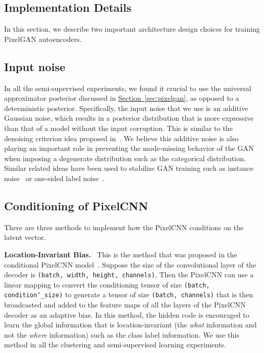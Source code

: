 \documentclass{article}
\newcommand{\mysec}[1]{\hyperref[sec:#1]{Section~\ref*{sec:#1}}}
\DeclareRobustCommand{\parhead}[1]{\textbf{#1}~}
\begin{document}
\begin{appendices}



\section{Implementation Details}\label{appendix:implementation}
In this section, we describe two important architecture design choices for training PixelGAN autoencoders.

\subsection{Input noise}
\label{appendix:input_noise}

In all the semi-supervised experiments, we found it crucial to use the universal approximator posterior discussed in \mysec{pixelgan}, as opposed to a deterministic posterior. Specifically, the input noise that we use is an additive Gaussian noise, which results in a posterior distribution  that is more expressive than that of a model without the input corruption. This is similar to the denoising criterion idea proposed in~\citep{denoising-vae}. We believe this additive noise is also playing an important role in preventing the mode-missing behavior of the GAN when imposing a degenerate distribution such as the categorical distribution. Similar related ideas have been used to stabilize GAN training such as instance noise~\citep{instance} or one-sided label noise~\citep{improved-gan}.

\subsection{Conditioning of PixelCNN}
\label{appendix:conditioning_of_pixelcnn}

There are three methods to implement how the PixelCNN conditions on the latent vector.

\parhead{Location-Invariant Bias.} This is the method that was proposed in the conditional PixelCNN model~\citep{pixelcnn}. Suppose the size of the convolutional layer of the decoder is \texttt{(batch, width, height, channels)}. 
Then the PixelCNN can use a linear mapping to convert the conditioning tensor of size \texttt{(batch, condition\char`_size)} to generate a tensor of size \texttt{(batch, channels)} that is then broadcasted and added to the feature maps of all the layers of the PixelCNN decoder as an adaptive bias. In this method, the hidden code is encouraged to learn the global information that is location-invariant (the \emph{what} information and not the \emph{where} information) such as the class label information. We use this method in all the clustering and semi-supervised learning experiments. 



\end{appendices}
\end{document}
